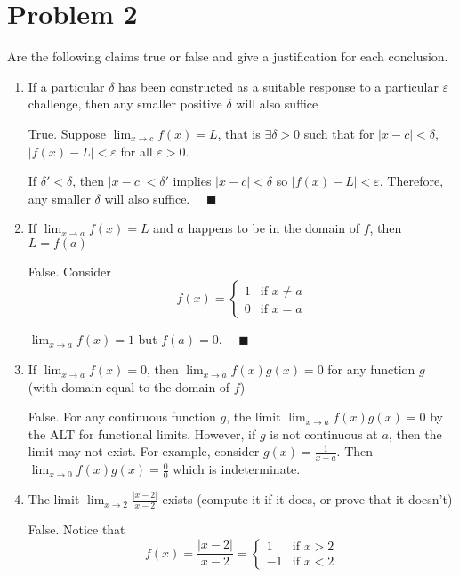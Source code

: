 \documentclass[12pt]{article}
\newcommand{\qed}{\quad \blacksquare}
\newcommand{\abs}[1]{\left\vert #1 \right\vert}
\newcommand{\ep}{\varepsilon}
\begin{document}
\section*{Problem 2}
Are the following claims true or false and give a justification for each conclusion.
\begin{enumerate}
	\item If a particular $\delta$ has been constructed as a suitable response to a particular $\varepsilon$ challenge, then any smaller positive $\delta$ will also suffice
	
        \color{blue}
            True. Suppose $\lim_{x \to c} f(x) = L$, that is $\exists \delta > 0$ such that for $\abs{x - c} < \delta$, $\abs{f(x) - L} < \ep$ for all $\ep > 0$.
            
            If $\delta' < \delta$, then $\abs{x - c} < \delta'$ implies $\abs{x - c} < \delta$ so $\abs{f(x) - L} < \ep$. Therefore, any smaller $\delta$ will also suffice. $\qed$
        \color{black}

	\item If $\lim_{x\to a}f(x)=L$ and $a$ happens to be in the domain of $f$, then $L=f(a)$
    
        \color{blue}
            False. Consider 
            \[f(x) = \begin{cases}
                1 & \text{if } x \neq a\\
                0 & \text{if } x = a
            \end{cases}\]

            $\lim_{x \to a} f(x) = 1$ but $f(a) = 0$. $\qed$
        \color{black}

	\item If $\lim_{x\to a}f(x)=0$, then $\lim_{x\to a} f(x)g(x)=0$ for any function $g$ (with domain equal to the domain of $f$)
	
        \color{blue}
            False. For any continuous function $g$, the limit $\lim_{x \to a} f(x)g(x) = 0$ by the ALT for functional limits. However, if $g$ is not continuous at $a$, then the limit may not exist. For example, consider $g(x) = \frac{1}{x - a}$. Then $\lim_{x \to 0} f(x)g(x) = \frac{0}{0}$ which is indeterminate.
        \color{black}

	\item The limit $\lim_{x\to 2}\frac{\abs{x-2}}{x-2}$ exists (compute it if it does, or prove that it doesn't) 
	
        \color{blue}
            False. Notice that 
            \[f(x) = \frac{\abs{x-2}}{x - 2} = \begin{cases}
                1 & \text{if } x > 2\\
                -1 & \text{if } x < 2
            \end{cases}\]


\end{enumerate}
\end{document}
